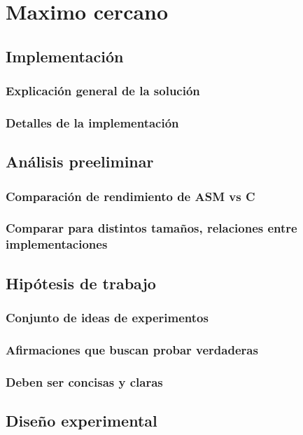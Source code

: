 \section{Maximo cercano}

\subsection{Implementación}
\subsubsection*{Explicación general de la solución}
\subsubsection*{Detalles de la implementación}


\subsection{Análisis preeliminar}
\subsubsection*{Comparación de rendimiento de ASM vs C}
\subsubsection*{Comparar para distintos tamaños, relaciones entre implementaciones}

\subsection{Hipótesis de trabajo}
\subsubsection*{Conjunto de ideas de experimentos}
\subsubsection*{Afirmaciones que buscan probar verdaderas}
\subsubsection*{Deben ser concisas y claras}

\subsection{Diseño experimental}
